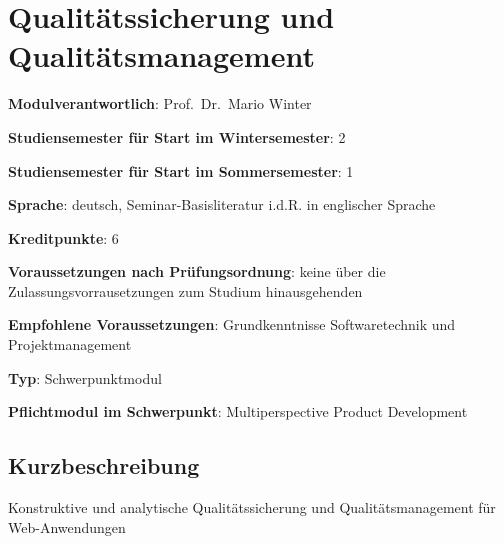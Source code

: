 \chapter{Qualitätssicherung und
Qualitätsmanagement\label{/mi-2017/modulbeschreibungen-master/MA_WTW_Modul_QUS_Winter}}\label{qualituxe4tssicherung-und-qualituxe4tsmanagementpathlabelmi-2017modulbeschreibungen-mastermaux5fwtwux5fmodulux5fqusux5fwinter}

\begin{modulHead}
\textbf{Modulverantwortlich}: Prof.~Dr.~Mario
Winter
\end{modulHead}
\begin{modulHead}
\textbf{Studiensemester für
Start im Wintersemester}:
2
\end{modulHead}
\begin{modulHead}
\textbf{Studiensemester für Start
im Sommersemester}:
1
\end{modulHead}
\begin{modulHead}
\textbf{Sprache}: deutsch,
Seminar-Basisliteratur i.d.R. in englischer
Sprache
\end{modulHead}
\begin{modulHead}
\textbf{Kreditpunkte}:
6
\end{modulHead}
\begin{modulHead}
\textbf{Voraussetzungen nach
Prüfungsordnung}: keine über die Zulassungsvorrausetzungen zum Studium
hinausgehenden
\end{modulHead}
\begin{modulHead}
\textbf{Empfohlene
Voraussetzungen}: Grundkenntnisse Softwaretechnik und
Projektmanagement
\end{modulHead}
\begin{modulHead}
\textbf{Typ}:
Schwerpunktmodul
\end{modulHead}
\begin{modulHead}
\textbf{Pflichtmodul
im Schwerpunkt}: Multiperspective Product Development
\end{modulHead}


\section*{Kurzbeschreibung\label{/mi-2017/modulbeschreibungen-master/MA_WTW_Modul_QUS_Winter}}\label{kurzbeschreibungpathlabelmi-2017modulbeschreibungen-mastermaux5fwtwux5fmodulux5fqusux5fwinter}

Konstruktive und analytische Qualitätssicherung und Qualitätsmanagement
für Web-Anwendungen

